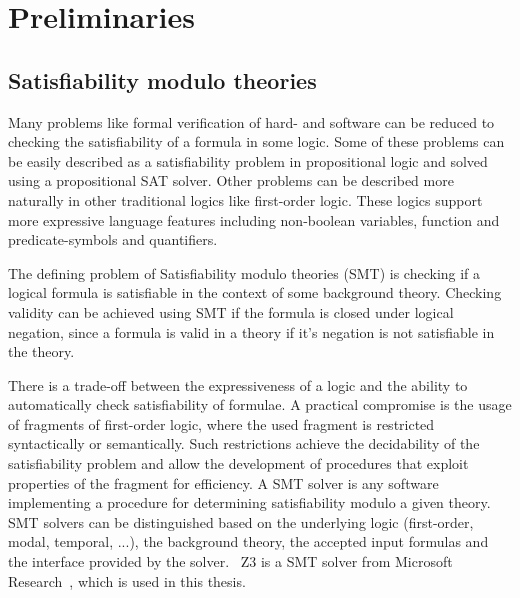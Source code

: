 \chapter{Preliminaries}
\label{chp:pre}
\section{Satisfiability modulo theories}
\label{sec:smt}
Many problems like formal verification of hard- and software can be reduced
to checking the satisfiability of a formula in some logic.
Some of these problems can be easily described as a satisfiability problem
in propositional logic and solved using a propositional SAT solver.
Other problems can be described more naturally in other traditional logics like first-order logic.
These logics support more expressive language features including
non-boolean variables, function and predicate-symbols and quantifiers.

The defining problem of Satisfiability modulo theories (SMT)
is checking if a logical formula is satisfiable in the context of some background theory.
Checking validity can be achieved using SMT if the formula is closed under logical negation,
since a formula is valid in a theory if it's negation is not satisfiable in the theory.

There is a trade-off between the expressiveness of a logic and
the ability to automatically check satisfiability of formulae.
A practical compromise is the usage of fragments of first-order logic,
where the used fragment is restricted syntactically or semantically. %
Such restrictions achieve the decidability of the satisfiability problem and
allow the development of procedures that exploit properties of the fragment for efficiency.
A SMT solver is any software implementing a procedure for determining satisfiability modulo a given theory.
SMT solvers can be distinguished based on the underlying logic (first-order, modal, temporal, ...),
the background theory, the accepted input formulas and the interface provided by the solver.~\cite{smt,smtlib}
Z3 is a SMT solver from Microsoft Research~\cite{z3}, which is used in this thesis.

